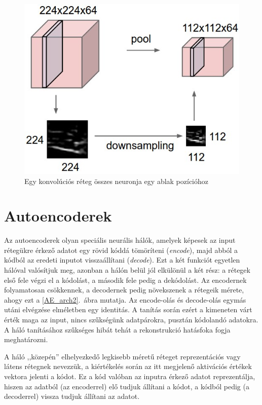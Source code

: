 \begin{figure}[h!]
\begin{center}
  
	\begin{center}
	\includegraphics[width=0.5\linewidth]{pool.jpeg}
	\end{center}
	
  \caption{Egy konvolúciós réteg összes neuronja egy ablak pozícióhoz}\label{pool}
\end{center}
\end{figure}

\section{Autoencoderek}

Az autoencoderek olyan speciális neurális hálók, amelyek képesek az input rétegükre érkező adatot egy rövid kóddá tömöríteni (\emph{encode}), majd abból a kódból az eredeti inputot visszaállítani (\emph{decode}). Ezt a két funkciót egyetlen hálóval valósítjuk meg, azonban a hálón belül jól elkülönül a két rész: a rétegek első fele végzi el a kódolást, a második fele pedig a dekódolást. Az encodernek folyamatosan csökkennek, a decodernek pedig növekszenek a rétegeik mérete, ahogy ezt a \ref{AE_arch2}.~ábra mutatja. Az encode-olás és decode-olás egymás utáni elvégzése elméletben egy identitás. A tanítás során ezért a kimeneten várt érték maga az input, nincs szűkségünk adatpárokra, pusztán kódolandó adatokra. A háló tanításához szűkséges hibát tehát a rekonstrukció hatásfoka fogja meghatározni.

A háló ,,közepén'' elhelyezkedő legkisebb méretű réteget reprezentációs vagy látens rétegnek nevezzük, a kiértékelés során az itt megjelenő aktivációs értékek vektora jelenti a kódot. Ez a kód valóban az inputra érkező adatot reprezentálja, hiszen az adatból (az encoderrel) elő tudjuk állítani a kódot, a kódból pedig (a decoderrel) vissza tudjuk állítani az adatot.


